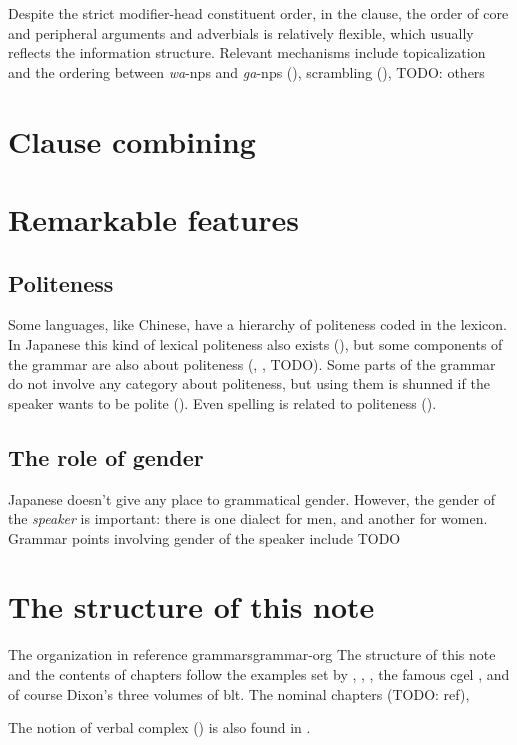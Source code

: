 \documentclass[UTF8, a4paper, oneside, scheme=plain]{ctexrep}
\newcommand{\corpus}[1]{\emph{#1}}
\begin{document}
Despite the strict modifier-head constituent order,
in the clause, the order of core and peripheral arguments and adverbials is relatively flexible,
which usually reflects the information structure.
Relevant mechanisms include 
topicalization and the ordering between \corpus{wa}-\ac{np}s and \corpus{ga}-\ac{np}s 
(), scrambling (), 
TODO: others

\section{Clause combining}

\section{Remarkable features}

\subsection{Politeness}

Some languages, like Chinese, have a hierarchy of politeness coded in the lexicon.
In Japanese this kind of lexical politeness also exists (),
but some components of the grammar are also about politeness
(, , TODO).
Some parts of the grammar do not involve any category about politeness,
but using them is shunned if the speaker wants to be polite
().
Even spelling is related to politeness ().

\subsection{The role of gender}

Japanese doesn't give any place to grammatical gender.
However, the gender of the \emph{speaker} is important:
there is one dialect for men,
and another for women.
Grammar points involving gender of the speaker include TODO

\section{The structure of this note}

\begin{theorybox}{The organization in reference grammars}{grammar-org}
    The structure of this note and the contents of chapters follow 
    the examples set by \citet{Friesen2017}, \citet{jacques2021grammar}, \citet{Grimm2021},
    the famous \acs{cgel} \citep{cgel}, and of course Dixon's three volumes of \acs{blt}.
    The nominal chapters (TODO: ref), 
    
    The notion of verbal complex () is also found in 
    \citet{Friesen2017}.
\end{theorybox}
\end{document}
